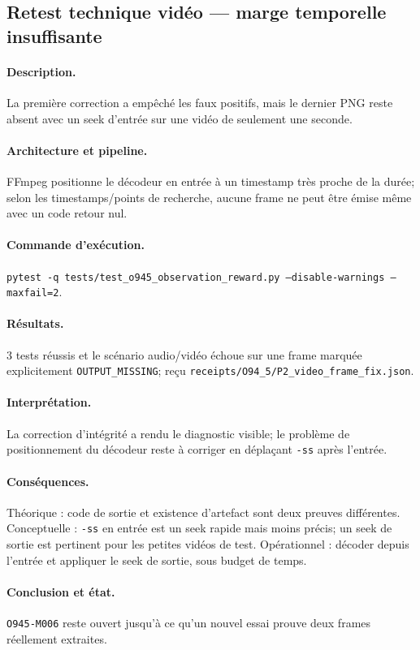 \documentclass[11pt,a4paper]{article}
\begin{document}
\subsection{Retest technique vidéo — marge temporelle insuffisante}
\paragraph{Description.} La première correction a empêché les faux positifs, mais le dernier PNG reste absent avec un seek d'entrée sur une vidéo de seulement une seconde.
\paragraph{Architecture et pipeline.} FFmpeg positionne le décodeur en entrée à un timestamp très proche de la durée; selon les timestamps/points de recherche, aucune frame ne peut être émise même avec un code retour nul.
\paragraph{Commande d'exécution.} \texttt{pytest -q tests/test\_o945\_observation\_reward.py --disable-warnings --maxfail=2}.
\paragraph{Résultats.} 3 tests réussis et le scénario audio/vidéo échoue sur une frame marquée explicitement \texttt{OUTPUT\_MISSING}; reçu \texttt{receipts/O94\_5/P2\_video\_frame\_fix.json}.
\paragraph{Interprétation.} La correction d'intégrité a rendu le diagnostic visible; le problème de positionnement du décodeur reste à corriger en déplaçant \texttt{-ss} après l'entrée.
\paragraph{Conséquences.} Théorique : code de sortie et existence d'artefact sont deux preuves différentes. Conceptuelle : \texttt{-ss} en entrée est un seek rapide mais moins précis; un seek de sortie est pertinent pour les petites vidéos de test. Opérationnel : décoder depuis l'entrée et appliquer le seek de sortie, sous budget de temps.
\paragraph{Conclusion et état.} \texttt{O945-M006} reste ouvert jusqu'à ce qu'un nouvel essai prouve deux frames réellement extraites.
\end{document}
